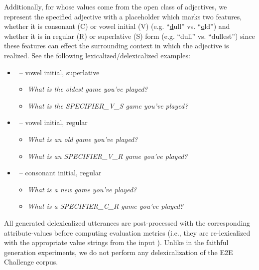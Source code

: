 \label{app:specifier} Additionally, for  whose values come from the open class of
adjectives, we represent the specified adjective with a placeholder which
marks two features, whether it is consonant (C) or vowel initial (V) (e.g.
``\uline{d}ull'' vs. ``\uline{o}ld'') and whether it is in regular (R) or
superlative (S) form (e.g. ``dull'' vs. ``dullest'') since these features can
effect the surrounding context in which the adjective is realized.  See the
following lexicalized/delexicalized examples:
\begin{itemize}
        \item {}~-- vowel initial, superlative
\begin{itemize}
    \item \textit{What is the oldest game you've played?}
    \item \textit{What is the SPECIFIER\_V\_S game you've played?}
\end{itemize}
        \item {}~-- vowel initial, regular

\begin{itemize}
    \item \textit{What is an old game you've played?}
    \item \textit{What is an SPECIFIER\_V\_R game you've played?}
\end{itemize}

        \item {}~-- consonant initial, regular

\begin{itemize}
    \item \textit{What is a new game you've played?}
    \item \textit{What is a SPECIFIER\_C\_R game you've played?}
\end{itemize}
\end{itemize}

All generated delexicalized utterances are post-processed with the
corresponding attribute-values before computing evaluation metrics (i.e., 
they are re-lexicalized with the appropriate value strings from the input \meaningrepresentation). Unlike in the faithful generation experiments, we 
do not perform any delexicalization of the E2E Challenge corpus.






